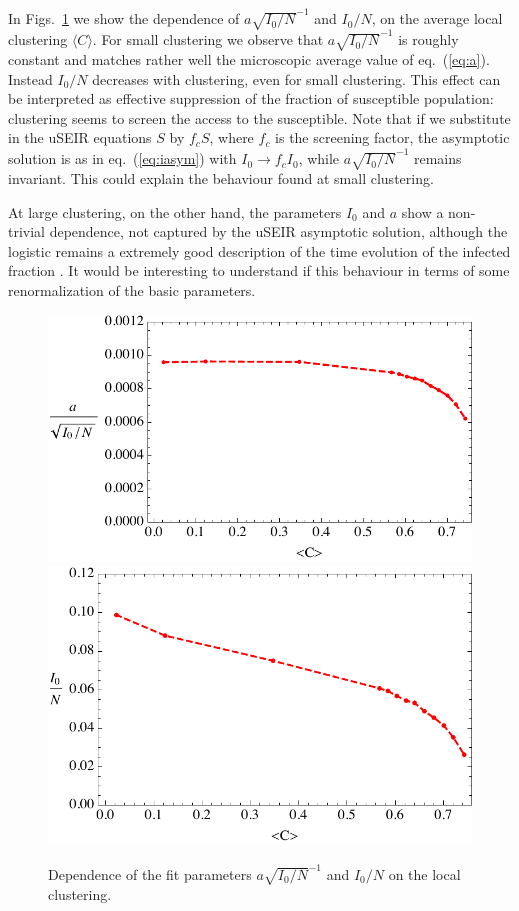 \documentclass[a4paper,oneside,11pt]{article}
\begin{document}
 In Figs.~\ref{fig:aovI0} we show the dependence of
$a \sqrt{I_0/N}^{-1}$ and $I_0/N$, on the average local clustering $\langle C \rangle$. For small clustering we observe that $a \sqrt{I_0/N}^{-1}$ is roughly constant and  matches rather well the microscopic average value of eq.~(\ref{eq:a}). Instead $I_0/N$ decreases with clustering, even for small clustering. This effect can be interpreted as effective suppression of the fraction of susceptible population: clustering seems to screen the access to the susceptible. Note that if we substitute in the uSEIR equations $S$ by $f_c S$, where $f_c$ is the screening factor, the asymptotic solution is as in eq.~(\ref{eq:iasym})
with $I_0 \rightarrow f_c I_0$, while $a \sqrt{I_0/N}^{-1}$ remains invariant. This could explain the behaviour found at small clustering. 

At large clustering, on the other hand, the parameters $I_0$ and $a$ show a non-trivial dependence, not captured by the uSEIR asymptotic solution, although the logistic remains a extremely good description of the time evolution of the infected fraction . It would be interesting to understand if this behaviour in terms of some renormalization of the basic parameters.


\begin{figure}[htbp]
\centering
 \hspace{-1.5cm}
 \includegraphics[width=.85\linewidth]{CdepAA.pdf}\\ \includegraphics[width=.75\linewidth]{CdepbAA.pdf}
\caption{Dependence of the fit parameters $a \sqrt{I_0/N}^{-1}$ and $I_0/N$ on the local clustering. }
\label{fig:aovI0}
\end{figure}
\end{document}
